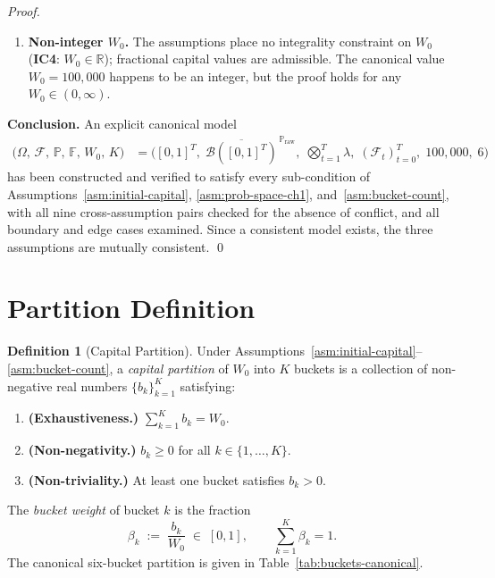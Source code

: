 \documentclass[12pt,openany]{book}
\newcommand{\calF}{\mathcal{F}}
\newcommand{\Prob}{\mathbb{P}}
\numberwithin{equation}{chapter}
\theoremstyle{plain}
\theoremstyle{definition}
\newtheorem{definition}[theorem]{Definition}
\theoremstyle{remark}
\numberwithin{equation}{chapter}
\theoremstyle{plain}
\begin{document}
\begin{proof}
\begin{enumerate}[label=\textbf{Phase~\Roman*.}]
\begin{enumerate}[label=\textbf{Step~6.\arabic*.}]
  \item \textbf{Non-integer $W_0$.}
        The assumptions place no integrality constraint on $W_0$
        (\textbf{IC4}: $W_0 \in \mathbb{R}$); fractional capital
        values are admissible.  The canonical value $W_0 = 100{,}000$
        happens to be an integer, but the proof holds for any
        $W_0 \in (0,\infty)$.  \checkmark

\end{enumerate}

\end{enumerate}

\medskip
\noindent
\textbf{Conclusion.}
An explicit canonical model
\begin{align}
  \bigl(\Omega,\, \calF,\, \Prob,\, \mathbb{F},\, W_0,\, K\bigr)
  &= \bigl(
       [0,1]^T,\;
       \overline{\mathcal{B}([0,1]^T)}^{\,\Prob_{\mathrm{raw}}},\;
       {\textstyle\bigotimes_{t=1}^T}\lambda,\;
       (\calF_t)_{t=0}^T,\;
       100{,}000,\;
       6
     \bigr)
  \label{eq:canonical-model}
\end{align}
has been constructed and verified to satisfy every sub-condition of
Assumptions~\ref{asm:initial-capital}, \ref{asm:prob-space-ch1},
and~\ref{asm:bucket-count}, with all nine cross-assumption pairs
checked for the absence of conflict, and all boundary and edge cases
examined.  Since a consistent model exists, the three assumptions
are mutually consistent.
\qed
\end{proof}

\section{Partition Definition}

\begin{definition}[Capital Partition]
\label{def:partition}
Under Assumptions~\ref{asm:initial-capital}--\ref{asm:bucket-count},
a \emph{capital partition} of $W_0$ into $K$ buckets is a collection
of non-negative real numbers $\{b_k\}_{k=1}^{K}$ satisfying:

\begin{enumerate}[label=\textbf{(P\arabic*)}]
  \item \textbf{(Exhaustiveness.)}
        $\displaystyle\sum_{k=1}^{K} b_k = W_0$.
  \item \textbf{(Non-negativity.)}
        $b_k \geq 0$ for all $k \in \{1,\ldots,K\}$.
  \item \textbf{(Non-triviality.)}
        At least one bucket satisfies $b_k > 0$.
\end{enumerate}

\noindent
The \emph{bucket weight} of bucket $k$ is the fraction
\begin{equation}
  \beta_k \;:=\; \frac{b_k}{W_0} \;\in\; [0,1],
  \qquad \sum_{k=1}^{K} \beta_k = 1.
  \label{eq:bucket-weight}
\end{equation}
The canonical six-bucket partition is given in
Table~\ref{tab:buckets-canonical}.
\end{definition}
\end{document}
